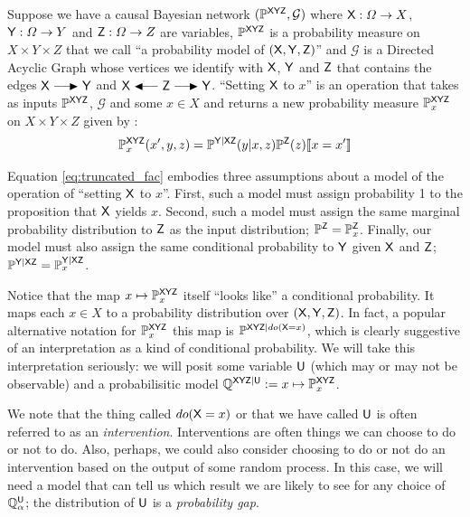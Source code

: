 Suppose we have a causal Bayesian network $(\mathbb{P}^{\mathsf{XYZ}},\mathcal{G})$ where $\mathsf{X}:\Omega\to X$, $\mathsf{Y}:\Omega\to Y$ and $\mathsf{Z}:\Omega\to Z$ are variables, $\mathbb{P}^{\mathsf{XYZ}}$ is a probability measure on $X\times Y\times Z$ that we call ``a probability model of $(\mathsf{X},\mathsf{Y},\mathsf{Z})$'' and $\mathcal{G}$ is a Directed Acyclic Graph whose vertices we identify with $\mathsf{X}$, $\mathsf{Y}$ and $\mathsf{Z}$ that contains the edges $\RV{X}\longrightarrowRHD \RV{Y}$ and $\RV{X}\longleftarrowRHD \RV{Z} \longrightarrowRHD \RV{Y}$. ``Setting $\mathsf{X}$ to $x$'' is an operation that takes as inputs $\mathbb{P}^{\mathsf{XYZ}}$, $\mathcal{G}$ and some $x\in X$ and returns a new probability measure $\mathbb{P}_x^{\mathsf{XYZ}}$ on $X\times Y\times Z$ given by \citep[page ~24]{pearl_causality:_2009}:
\begin{align}
	\mathbb{P}^{\mathsf{XYZ}}_{x}(x',y,z)=\mathbb{P}^{\mathsf{Y|XZ}}(y|x,z)\mathbb{P}^{\mathsf{Z}}(z)\llbracket x=x' \rrbracket\label{eq:truncated_fac}
\end{align}

Equation \ref{eq:truncated_fac} embodies three assumptions about a model of the operation of ``setting $\mathsf{X}$ to $x$''. First, such a model must assign probability 1 to the proposition that $\mathsf{X}$ yields $x$. Second, such a model must assign the same marginal probability distribution to $\mathsf{Z}$ as the input distribution; $\mathbb{P}^{\mathsf{Z}}=\mathbb{P}_{x}^{\mathsf{Z}}$. Finally, our model must also assign the same conditional probability to $\mathsf{Y}$ given $\mathsf{X}$ and $\mathsf{Z}$; $\mathbb{P}^{\mathsf{Y}|\mathsf{XZ}}=\mathbb{P}_x^{\mathsf{Y}|\mathsf{XZ}}$.

Notice that the map $x\mapsto \mathbb{P}^{\mathsf{XYZ}}_x$ itself ``looks like'' a conditional probability. It maps each $x\in X$ to a probability distribution over $(\mathsf{X},\mathsf{Y},\mathsf{Z})$. In fact, a popular alternative notation for $\mathbb{P}^{\mathsf{XYZ}}_x$ this map is $\mathbb{P}^{\mathsf{XYZ}|do(\mathsf{X}=x)}$, which is clearly suggestive of an interpretation as a kind of conditional probability. We will take this interpretation seriously: we will posit some variable $\mathsf{U}$ (which may or may not be observable) and a probabilisitic model $\mathbb{Q}^{\mathsf{XYZ}|\mathsf{U}}:=x\mapsto \mathbb{P}^{\mathsf{XYZ}}_x$.

We note that the thing called $do(\mathsf{X}=x)$ or that we have called $\mathsf{U}$ is often referred to as an \emph{intervention}. Interventions are often things we can choose to do or not to do. Also, perhaps, we could also consider choosing to do or not do an intervention based on the output of some random process. In this case, we will need a model that can tell us which result we are likely to see for any choice of $\mathbb{Q}_\alpha^{\mathsf{U}}$; the distribution of $\mathsf{U}$ is a \emph{probability gap}.

